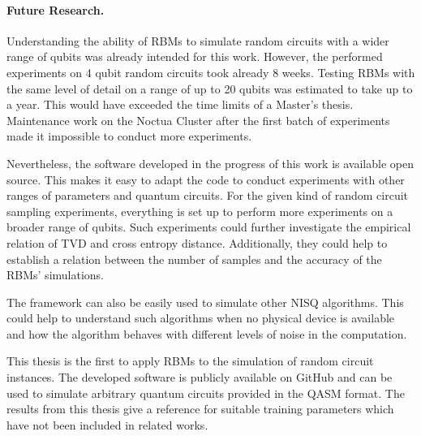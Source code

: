 \paragraph{Future Research.}
Understanding the ability of RBMs to simulate random circuits with a wider range of qubits 
was already intended for this work. However, the performed experiments 
on 4 qubit random circuits took already 8 weeks. Testing RBMs with the same 
level of detail on a range of up to 20 qubits was estimated to take up to 
a year. This would have exceeded the time limits of a Master's thesis. Maintenance work on the Noctua Cluster 
after the first batch of experiments made it impossible to conduct more experiments.

Nevertheless, the software developed in the progress of this work is available open source. 
This makes it easy to adapt the code to conduct experiments 
with other ranges of parameters and quantum circuits. For the given kind of random circuit 
sampling experiments, everything is set up to perform more experiments on a broader range of 
qubits. Such experiments could further investigate the empirical relation of TVD and cross entropy 
distance. Additionally, they could help to establish a relation between the number of samples and 
the accuracy of the RBMs' simulations.

The framework can also be easily used to simulate other NISQ algorithms. This could help to 
understand such algorithms when no physical device is available and how the algorithm
behaves with different levels of noise in the computation.

This thesis is the first to apply RBMs to the simulation of random circuit instances. 
The developed software is publicly available on GitHub \cite{NQS2020} and can be used to simulate arbitrary quantum 
circuits provided in the QASM format. The results from 
this thesis give a reference for suitable training parameters which have not been included in related works.


